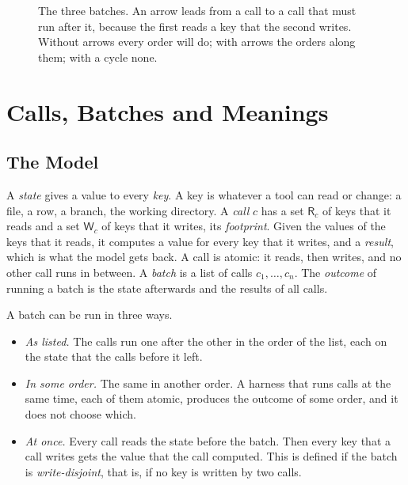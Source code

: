 \documentclass[acmsmall,nonacm,screen]{acmart}
\newcommand{\kw}[1]{\mathsf{#1}}
\newcommand{\R}{\kw{R}}
\newcommand{\W}{\kw{W}}
\begin{document}
\begin{figure}
\centering
{}
\caption{The three batches. An arrow leads from a call to a call that must run after it,
because the first reads a key that the second writes. Without arrows every order will do;
with arrows the orders along them; with a cycle none.}\label{fig:batches}
\end{figure}

\section{Calls, Batches and Meanings}\label{sec:model}

\subsection{The Model}

A \emph{state} gives a value to every \emph{key}. A key is whatever a tool can read or
change: a file, a row, a branch, the working directory. A \emph{call} $c$ has a set
$\R_c$ of keys that it reads and a set $\W_c$ of keys that it writes, its \emph{footprint}.
Given the values of the keys that it reads, it computes a value for every key that it
writes, and a \emph{result}, which is what the model gets back. A call is atomic: it reads,
then writes, and no other call runs in between. A \emph{batch} is a list of calls $c_1,
\ldots, c_n$. The \emph{outcome} of running a batch is the state afterwards and the results
of all calls.

A batch can be run in three ways.
\begin{itemize}
\item \emph{As listed.} The calls run one after the other in the order of the list, each on
  the state that the calls before it left.
\item \emph{In some order.} The same in another order. A harness that runs calls at the same
  time, each of them atomic, produces the outcome of some order, and it does not choose
  which.
\item \emph{At once.} Every call reads the state before the batch. Then every key that a
  call writes gets the value that the call computed. This is defined if the batch is
  \emph{write-disjoint}, that is, if no key is written by two calls.
\end{itemize}
\end{document}
